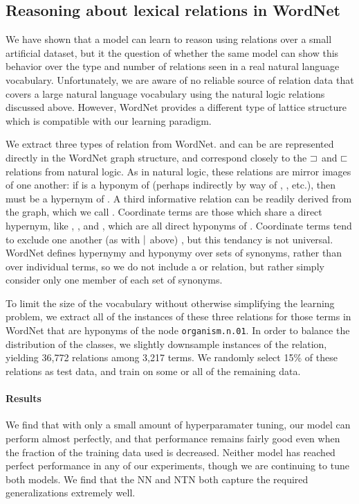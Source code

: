 \subsection*{Reasoning about lexical relations in WordNet}\label{sec:wordnet}

We have shown that a model can learn to reason using relations over a small artificial dataset, 
but it the question of whether the same model can show this behavior over the type and number of
relations seen in a real natural language vocabulary.
Unfortunately, we are aware of no reliable source of relation data that covers a large natural 
language vocabulary using the natural logic relations discussed above. However, WordNet 
\cite{fellbaum2010wordnet} provides a different type of lattice structure which is compatible with
our learning paradigm.

We extract three types of relation from WordNet.  and  can be are represented
directly in the WordNet graph structure, and correspond closely to the $\sqsupset$ and $\sqsubset$ relations from
natural logic. As in natural logic, these relations are mirror images of one another: if  is a
hyponym of  (perhaps indirectly by way of , , etc.), then  must be a 
hypernym of . A third informative relation can 
be readily derived from the graph, which we call . Coordinate terms are those which share
a direct hypernym, like , , and , which are all direct hyponyms of . 
Coordinate terms tend to exclude one another (as with $\mathbin{|}$ above) \cite{Hurford:1974}, but this tendancy
is not universal. WordNet defines hypernymy and hyponymy over sets of synonyms, rather than over individual 
terms, so we do not include a  or  relation, but rather simply consider only one
member of each set of synonyms.

To limit the size of the vocabulary without otherwise simplifying the learning problem, we extract all of the
instances of these three relations for those terms in WordNet that are hyponyms of the node \texttt{organism.n.01}.
In order to balance the distribution of the classes, we slightly downsample instances of the  relation,
yielding 36,772 relations among 3,217 terms. We randomly select 15\% of these relations as test data, and train on
some or all of the remaining data.

\paragraph{Results} 
We find that with only a small amount of hyperparamater tuning, our model can perform almost perfectly, and that performance remains fairly good even when the fraction of the training data used is decreased. Neither model has reached perfect performance in any of our experiments, though we are 
continuing to tune both models. We find that the NN and NTN both capture the required
generalizations extremely well.

